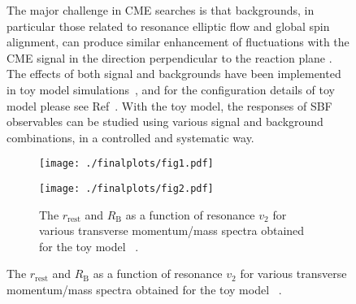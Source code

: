 \begin{figure}[htbp]
\label{simulation}
 The major challenge in CME searches is that backgrounds, in particular those related to resonance elliptic flow and global spin alignment, can produce similar enhancement of fluctuations with the CME signal in the direction perpendicular to the reaction plane \cite{tang2019, ref4}. The effects of both signal and backgrounds have been implemented in toy model simulations~\cite{Tang2019}, and for the configuration details of toy model please see Ref~\cite{toymodel}. With the toy model, the responses of SBF observables can be studied  using various signal and background combinations, in a controlled and systematic way.
 
 

\begin{figure}[htbp!]
\vspace{-0.4cm}
\centering 
\begin{minipage}[b]{0.33\textwidth} 
\centering 
\texttt{[image: ./finalplots/fig1.pdf]}
\caption{ The $r_{\mathrm{rest}}$, $r_{\mathrm{lab}}$ and  $R_{\mathrm{B}}$  as a function of $a_{1}$ obtained for the toy model (signal only, no backgrounds) ~\cite{tang2019probe}. 
\vspace{3.4mm}
 }
\label{Fig.1}
\end{minipage}
\hspace{0.10cm}
\begin{minipage}[b]{0.33\textwidth} 
\centering 
\texttt{[image: ./finalplots/fig2.pdf]}
\caption{  The $r_{\mathrm{rest}}$ and $R_{\mathrm{B}}$ as a function of resonance $v_{2}$ for various transverse momentum/mass spectra obtained for the toy model ~\cite{tang2019probe}. }
\label{Fig.2}
\end{minipage}
\end{figure}




\end{figure}
